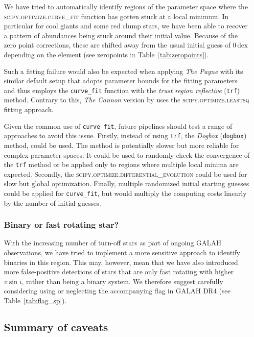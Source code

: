 \documentclass[
  journal=pasa,
  manuscript=research-paper, %
  year=2024,
  volume=37
]{cup-journal}
\newcommand{\vsini}{$v \sin i$\xspace}
\begin{document}
We have tried to automatically identify regions of the parameter space where the \textsc{scipy.optimize.curve\_fit} function has gotten stuck at a local minimum. In particular for cool giants and some red clump stars, we have been able to recover a pattern of abundances being stuck around their initial value. Because of the zero point corrections, these are shifted away from the usual initial guess of $0\,\mathrm{dex}$ depending on the element (see zeropoints in Table~\ref{tab:zeropoints}).

Such a fitting failure would also be expected when applying \textit{The Payne} \citep{Ting2019} with its similar default setup that adopts parameter bounds for the fitting parameters and thus employs the \texttt{curve\_fit} function with the \textit{trust region reflective} (\texttt{trf}) method. Contrary to this, \textit{The Cannon} version by \citep{Casey2016} uses the \textsc{scipy.optimize.leastsq} fitting approach.

Given the common use of \texttt{curve\_fit}, future pipelines should test a range of approaches to avoid this issue. Firstly, instead of using \texttt{trf}, the \textit{Dogbox} (\texttt{dogbox}) method,  could be used. The method is potentially slower but more reliable for complex parameter spaces. It could be used to randomly check the convergence of the \texttt{trf} method or be applied only to regions where multiple local minima are expected. Secondly, the \textsc{scipy.optimize.differential\_evolution} could be used for slow but global optimization. Finally, multiple randomized initial starting guesses could be applied for \texttt{curve\_fit}, but would multiply the computing costs linearly by the number of initial guesses.

\subsubsection{Binary or fast rotating star?}

With the increasing number of turn-off stars as part of ongoing GALAH observations, we have tried to implement a more sensitive approach to identify binaries in this region. This may, however, mean that we have also introduced more false-positive detections of stars that are only fast rotating with higher \vsini, rather than being a binary system. We therefore suggest carefully considering using or neglecting the accompanying flag in GALAH DR4 (see Table~\ref{tab:flag_sp}).

\subsection{Summary of caveats} \label{sec:caveats_summary}
\end{document}
